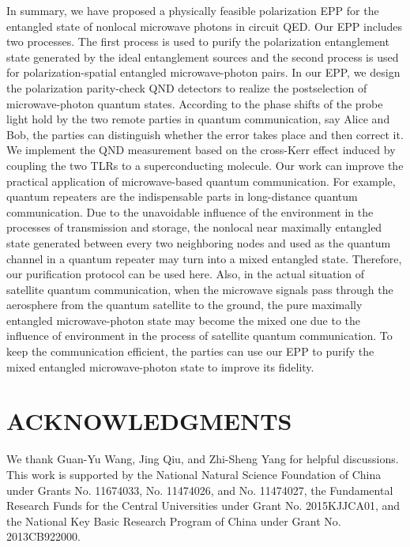 \documentclass[showpacs,aps,graphicx,twocolumn]{revtex4}
\begin{document}
In summary, we have proposed a physically feasible polarization EPP
for the entangled state of nonlocal microwave photons in circuit
QED. Our EPP includes two processes. The first process is used to purify
the polarization entanglement state generated by the ideal
entanglement sources and the second process is used for
polarization-spatial entangled microwave-photon pairs. In our EPP,
we design the polarization parity-check QND detectors to realize the
postselection of microwave-photon quantum states. According to the
phase shifts of the probe light hold by the two remote parties in
quantum communication, say Alice and Bob, the parties can
distinguish whether the error takes place and then correct it. We
implement the QND measurement based on the cross-Kerr effect induced by
coupling the two TLRs to a superconducting molecule. Our work can
improve the practical application of microwave-based quantum
communication. For example, quantum repeaters are the indispensable
parts in long-distance quantum communication. Due to the unavoidable
influence of the environment in the processes of transmission and
storage, the nonlocal near maximally entangled state generated
between every two neighboring nodes and used as the quantum channel
in a quantum repeater may turn into a mixed entangled state.
Therefore, our purification protocol can be used here. Also, in the
actual situation of satellite quantum communication, when the
microwave signals pass through the aerosphere from the quantum
satellite to the ground, the pure maximally entangled
microwave-photon state may become the mixed one due to the influence
of environment in the process of satellite quantum communication. To keep the communication efficient, the parties can use our
EPP to purify the mixed entangled microwave-photon state to improve
its fidelity.






\section*{ACKNOWLEDGMENTS}


We thank Guan-Yu Wang, Jing Qiu, and Zhi-Sheng Yang for helpful
discussions. This work is supported by the National Natural Science
Foundation of China under Grants No. 11674033, No. 11474026, and No.
11474027,  the Fundamental Research Funds for the Central
Universities under Grant No. 2015KJJCA01, and the National Key
Basic Research Program of China under Grant No. 2013CB922000.\\
\end{document}
